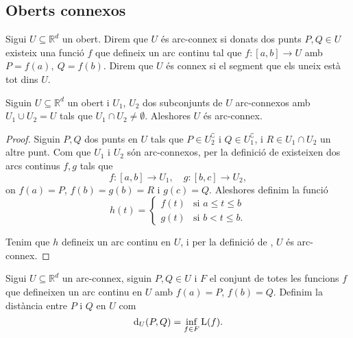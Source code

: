\documentclass[../Apunts.tex]{subfiles}
\begin{document}
	\subsection{Oberts connexos}
	\begin{definition}
		\label{def:Arc-connex}
		\label{def:connex}
		Sigui \(U\subseteq\mathbb{R}^{d}\) un obert. Direm que \(U\) és arc-connex si donats dos punts \(P,Q\in U\) existeix una funció \(f\) que defineix un arc continu tal que \(f\colon[a,b]\longrightarrow U\) amb \(P=f(a),\ Q=f(b)\).
		Direm que \(U\) és connex si el segment que els uneix està tot dins \(U\).
	\end{definition}
	\begin{proposition}
		Siguin \(U\subseteq\mathbb{R}^{d}\) un obert i \(U_{1}\), \(U_{2}\) dos subconjunts de \(U\) arc-connexos amb \(U_{1}\cup U_{2}=U\) tals que \(U_{1}\cap U_{2}\neq\emptyset\). Aleshores \(U\) és arc-connex.
		\begin{proof}
			Siguin \(P,Q\) dos punts en \(U\) tals que \(P\in U_{2}^{\complement}\) i \(Q\in U_{1}^{\complement}\), i \(R\in U_{1}\cap U_{2}\) un altre punt. Com que \(U_{1}\) i \(U_{2}\) són arc-connexos, per la definició de  existeixen dos arcs continus \(f,g\) tals que
			\begin{displaymath}
			f\colon[a,b]\longrightarrow U_{1},\quad
			g\colon[b,c]\longrightarrow U_{2},
			\end{displaymath}
			on \(f(a)=P\), \(f(b)=g(b)=R\) i \(g(c)=Q\).
			Aleshores definim la funció
			\[h(t)=
			\begin{cases}
			f(t) & \text{si }a\leq t\leq b\\
			g(t) & \text{si }b<t\leq b.
			\end{cases}\]
			
			Tenim que \(h\) defineix un arc continu en \(U\), i per la definició de , \(U\) és arc-connex.
		\end{proof}
	\end{proposition}
	\begin{definition}
		\label{def:distància en un arc-connex}
		Sigui \(U\subseteq\mathbb{R}^{d}\) un arc-connex, siguin \(P,Q\in U\) i \(F\) el conjunt de totes les funcions \(f\) que defineixen un arc continu en \(U\) amb \(f(a)=P\), \(f(b)=Q\). Definim la distància entre \(P\) i \(Q\) en \(U\) com
		\begin{displaymath}
		\operatorname{d}_{U}(P,Q)=\inf_{f\in F}\operatorname{L}(f).
		\end{displaymath}
	\end{definition}
\end{document}
